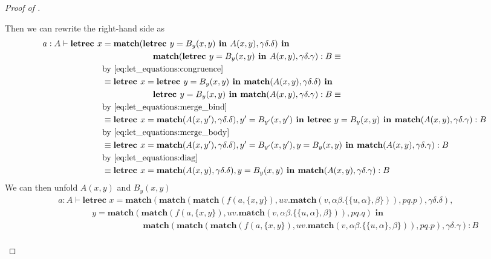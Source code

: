 \begin{proof}[Proof of ]
\begin{itemize}
Then we can rewrite the right-hand side as
\begin{align*}
a : A \vdash \textbf{letrec } x &= \textbf{match}(\textbf{letrec } y = B_{y}(x,y) \textbf{ in } A(x,y), \gamma\delta.\delta) \textbf{ in }\\
&\hspace{6em}\textbf{match}(\textbf{letrec } y = B_{y}(x,y) \textbf{ in } A(x,y), \gamma\delta.\gamma) : B \equiv\\
&\text{by \cref{eq:let_equations:congruence}}\\
&\equiv \textbf{letrec } x = \textbf{letrec } y = B_{y}(x,y) \textbf{ in } \textbf{match}(A(x,y),\gamma\delta.\delta) \textbf{ in }\\
&\hspace{6em} \textbf{letrec } y = B_{y}(x,y) \textbf{ in } \textbf{match}(A(x,y),\gamma\delta.\gamma) : B \equiv\\
&\text{by \cref{eq:let_equations:merge_bind}}\\
&\equiv \textbf{letrec } x = \textbf{match}(A(x,y'), \gamma\delta.\delta), y' = B_{y'}(x,y') \textbf{ in } \textbf{letrec } y = B_{y}(x,y) \textbf{ in } \textbf{match}(A(x,y), \gamma\delta.\gamma) : B\\
&\text{by \cref{eq:let_equations:merge_body}}\\
&\equiv \textbf{letrec } x = \textbf{match}(A(x,y'), \gamma\delta.\delta), y' = B_{y'}(x,y'), y = B_{y}(x,y) \textbf{ in } \textbf{match}(A(x,y), \gamma\delta.\gamma) : B\\
&\text{by \cref{eq:let_equations:diag}}\\
&\equiv \textbf{letrec } x = \textbf{match}(A(x,y), \gamma\delta.\delta), y = B_{y}(x,y) \textbf{ in } \textbf{match}(A(x,y), \gamma\delta.\gamma) : B
\end{align*}
We can then unfold $A(x,y)$ and $B_y(x,y)$
\begin{align*}
&a : A \vdash \textbf{letrec } x = \textbf{match}(\textbf{match}(\textbf{match}(f(a,\{x,y\}), uv.\textbf{match}(v, \alpha\beta.\{\{u,\alpha\},\beta\})), pq.p), \gamma\delta.\delta),\\
&\hspace{4em} y = \textbf{match}(\textbf{match}(f(a,\{x,y\}), uv.\textbf{match}(v, \alpha\beta.\{\{u,\alpha\},\beta\})), pq.q) \textbf{ in }\\
&\hspace{10em} \textbf{match}(\textbf{match}(\textbf{match}(f(a,\{x,y\}), uv.\textbf{match}(v, \alpha\beta.\{\{u,\alpha\},\beta\})), pq.p), \gamma\delta.\gamma) : B\\

\end{align*}
\end{itemize}
\end{proof}
